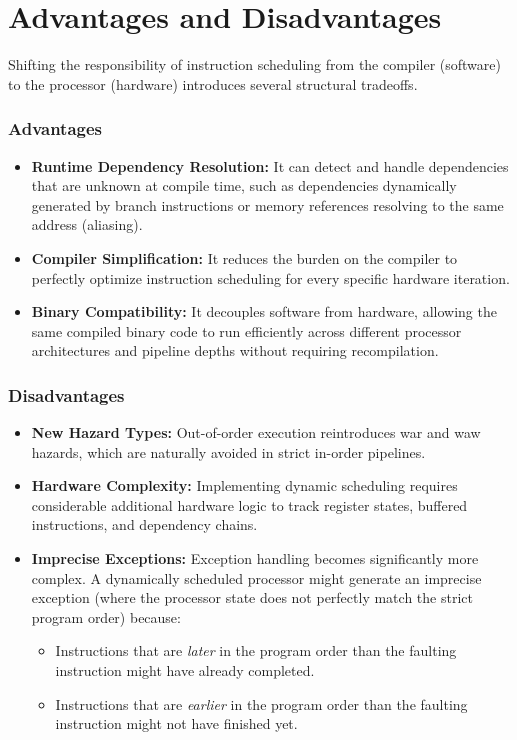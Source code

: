 \section{Advantages and Disadvantages}

Shifting the responsibility of instruction scheduling from the compiler (software) to the processor (hardware) introduces several structural tradeoffs.

\subsubsection*{Advantages}
\begin{itemize}
    \item \textbf{Runtime Dependency Resolution:} It can detect and handle dependencies that are unknown at compile time, such as dependencies dynamically generated by branch instructions or memory references resolving to the same address (aliasing).
    \item \textbf{Compiler Simplification:} It reduces the burden on the compiler to perfectly optimize instruction scheduling for every specific hardware iteration.
    \item \textbf{Binary Compatibility:} It decouples software from hardware, allowing the same compiled binary code to run efficiently across different processor architectures and pipeline depths without requiring recompilation.
\end{itemize}

\subsubsection*{Disadvantages}
\begin{itemize}
    \item \textbf{New Hazard Types:} Out-of-order execution reintroduces \gls{war} and \gls{waw} hazards, which are naturally avoided in strict in-order pipelines.
    \item \textbf{Hardware Complexity:} Implementing dynamic scheduling requires considerable additional hardware logic to track register states, buffered instructions, and dependency chains.
    \item \textbf{Imprecise Exceptions:} Exception handling becomes significantly more complex. A dynamically scheduled processor might generate an imprecise exception (where the processor state does not perfectly match the strict program order) because:
    \begin{itemize}
        \item Instructions that are \textit{later} in the program order than the faulting instruction might have already completed.
        \item Instructions that are \textit{earlier} in the program order than the faulting instruction might not have finished yet.
    \end{itemize}
\end{itemize}

